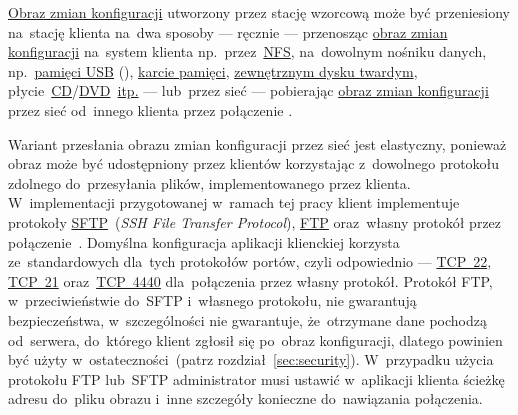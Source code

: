 \documentclass[thesis]{subfiles}
\begin{document}
\hyperref[sec:obraz-zmian-konfiguracji]{Obraz zmian konfiguracji} utworzony przez stację wzorcową może być przeniesiony na~stację klienta na~dwa sposoby --- ręcznie --- przenosząc \hyperref[sec:obraz-zmian-konfiguracji]{obraz zmian konfiguracji} na~system klienta np.~przez~\href{https://en.wikipedia.org/wiki/Network_File_System}{NFS}, na~dowolnym nośniku danych, np.~\href{https://en.wikipedia.org/wiki/USB_flash_drive}{pamięci USB} (), \href{https://en.wikipedia.org/wiki/Memory_card}{karcie pamięci}, \href{https://en.wikipedia.org/wiki/Hard_disk_drive\#External_hard_disk_drives}{zewnętrznym dysku twardym}, płycie~\href{https://en.wikipedia.org/wiki/Compact_disc}{CD}/\href{https://en.wikipedia.org/wiki/DVD}{DVD}~\href{https://en.wikipedia.org/wiki/USB_mass_storage_device_class}{itp.} --- lub~przez sieć --- pobierając \hyperref[sec:obraz-zmian-konfiguracji]{obraz zmian konfiguracji} przez sieć od~innego klienta przez połączenie .

Wariant przesłania obrazu zmian konfiguracji przez sieć jest elastyczny, ponieważ obraz może być udostępniony przez klientów korzystając z~dowolnego protokołu zdolnego do~przesyłania plików, implementowanego przez klienta. W~implementacji przygotowanej w~ramach tej pracy klient implementuje protokoły \href{https://en.wikipedia.org/wiki/SSH_File_Transfer_Protocol}{SFTP}~(\emph{SSH File Transfer Protocol}), \href{https://en.wikipedia.org/wiki/File_Transfer_Protocol}{FTP} oraz~własny protokół przez połączenie~. Domyślna konfiguracja aplikacji klienckiej korzysta ze~standardowych dla~tych protokołów portów, czyli odpowiednio --- \href{https://www.iana.org/assignments/service-names-port-numbers/service-names-port-numbers.xhtml?search=22}{TCP~22}, \href{https://www.iana.org/assignments/service-names-port-numbers/service-names-port-numbers.xhtml?search=21}{TCP~21} oraz~\href{https://www.iana.org/assignments/service-names-port-numbers/service-names-port-numbers.xhtml?search=4440}{TCP~4440} dla~połączenia przez własny protokół. Protokół FTP, w~przeciwieństwie do~SFTP i~własnego protokołu, nie gwarantują bezpieczeństwa, w~szczególności nie gwarantuje, że~otrzymane dane pochodzą od~serwera, do~którego klient zgłosił się po~obraz konfiguracji, dlatego powinien być użyty w~ostateczności~(patrz rozdział~\ref{sec:security}). W~przypadku użycia protokołu FTP lub~SFTP administrator musi ustawić w~aplikacji klienta ścieżkę adresu do~pliku obrazu i~inne szczegóły konieczne do~nawiązania połączenia.
\end{document}
